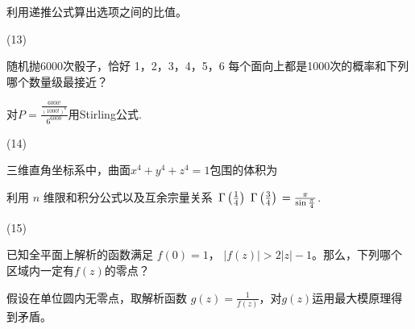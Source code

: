 \documentclass[12pt,CJK]{article}
\begin{document}
{{  {\small \red 利用递推公式算出选项之间的比值。}
}

\item[(13)]{随机抛6000次骰子，恰好 1，2，3，4，5，6 每个面向上都是1000次的概率和下列哪个数量级最接近？ 


{\small \red 对$P = \frac{\frac{6000!}{(1000!)^6}}{6^{6000}}$用Stirling公式.}
}

\item[(14)]{三维直角坐标系中，曲面$x^4+y^4+z^4=1$包围的体积为  


{\small \red 利用 $n$ 维限和积分公式以及互余宗量关系 $\,\Gamma\left( \frac{1}{4} \right)\,\,\Gamma\left( \frac{3}{4} \right)\, = \frac{\pi}{\sin\frac{\pi}{4}}$. }
}

\item[(15)]{已知全平面上解析的函数满足 $f(0) = 1$， $ |f(z)| > 2|z|-1 $。那么，下列哪个区域内一定有$f(z)$的零点？ 


{\red\small 假设在单位圆内无零点，取解析函数 $g(z)=\frac{1}{f(z)}$，对$g(z)$运用最大模原理得到矛盾。}
}
  
  \eitem
  }
\end{document}
